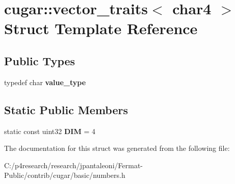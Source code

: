 \hypertarget{structcugar_1_1vector__traits_3_01char4_01_4}{}\section{cugar\+:\+:vector\+\_\+traits$<$ char4 $>$ Struct Template Reference}
\label{structcugar_1_1vector__traits_3_01char4_01_4}
\subsection*{Public Types}
\begin{DoxyCompactItemize}
\item 
\mbox{\label{structcugar_1_1vector__traits_3_01char4_01_4_a1d4bb6c0d6023d4c6d6de481046774b5}} 
typedef char {\bfseries value\+\_\+type}
\end{DoxyCompactItemize}
\subsection*{Static Public Members}
\begin{DoxyCompactItemize}
\item 
\mbox{\label{structcugar_1_1vector__traits_3_01char4_01_4_a6d27e18c95a52e0626e9c705002ce25e}} 
static const uint32 {\bfseries D\+IM} = 4
\end{DoxyCompactItemize}


The documentation for this struct was generated from the following file\+:\begin{DoxyCompactItemize}
\item 
C\+:/p4research/research/jpantaleoni/\+Fermat-\/\+Public/contrib/cugar/basic/numbers.\+h\end{DoxyCompactItemize}
